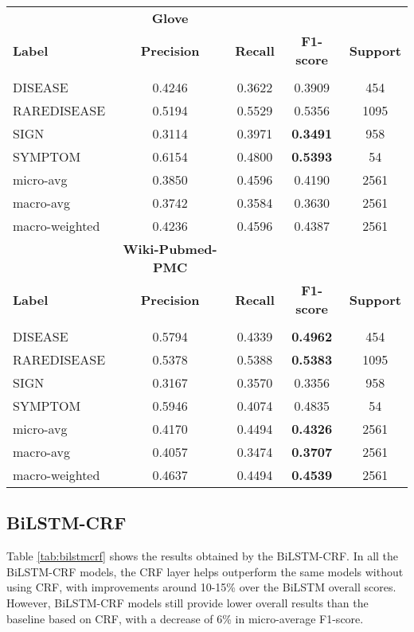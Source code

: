 \documentclass[preprint,12pt]{elsarticle}
\begin{document}
\begin{table}[!htbp]
\begin{tabular}{lcccc}
\hline
& \multicolumn{1}{c}{\textbf{Glove}} \\
{\bf Label} & {\bf Precision} &
{\bf Recall} &
{\bf F1-score} & {\bf Support} \\
\hline\\[-8pt]
DISEASE	&	0.4246	&	0.3622	&	 0.3909	&	454\\RAREDISEASE	&	0.5194	&	0.5529	&	0.5356	&	1095\\SIGN	&	0.3114	&	0.3971	&	\bf 0.3491	&	958\\
SYMPTOM	&	0.6154	&	0.4800	&	\bf 0.5393	&	54\\micro-avg	&	0.3850	&	0.4596	&	0.4190	&	2561\\macro-avg	&	0.3742	&	0.3584	&	0.3630	&	2561\\
macro-weighted	&	0.4236	&	0.4596	&	0.4387	&	2561\\
\hline
& \multicolumn{1}{c}{\textbf{Wiki-Pubmed-PMC}} \\
{\bf Label} & {\bf Precision} &
{\bf Recall} &
{\bf F1-score} & {\bf Support} \\
\hline\\[-8pt]
DISEASE	&	0.5794	&	0.4339	&	\bf 0.4962	&	454\\
RAREDISEASE	&	0.5378	&	   0.5388	&	\bf 0.5383	&	1095\\
SIGN	&	 0.3167	&	0.3570	&	 0.3356	&	958\\
SYMPTOM	&	0.5946	&	0.4074	&	 0.4835	&	54\\
micro-avg	&	0.4170	&	0.4494	&	\bf 0.4326	&	2561\\macro-avg	&	0.4057	&	0.3474	&	\bf 0.3707	&	2561\\
macro-weighted	&	0.4637	&	0.4494	& \bf	0.4539	&	2561\\


\hline
\end{tabular}
\end{table}



\subsection{BiLSTM-CRF}

Table \ref{tab:bilstmcrf} shows the results obtained by the BiLSTM-CRF. In all the BiLSTM-CRF models, the CRF layer helps  outperform the same models without using CRF, with improvements around 10-15\% over the BiLSTM overall scores. 
However, BiLSTM-CRF models still provide lower overall results than the baseline based on CRF, with a decrease of 6\% in micro-average F1-score. 
\end{document}
